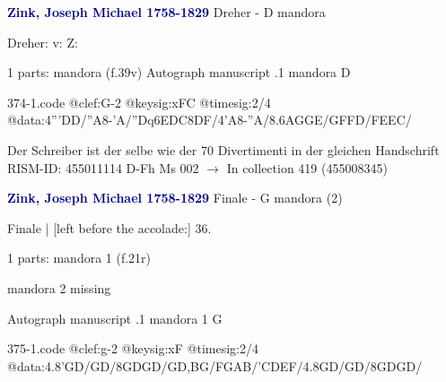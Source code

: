 \documentclass[twocolumn]{book}
\begin{document}
\newline \par \vspace{7pt} \textcolor{darkblue}{\textbf{Zink, Joseph Michael  1758-1829}}
\newline Dreher - D
\newline mandora
\newline \begin{itshape}[f.39v, at left:] Dreher: v: Z:\end{itshape} 
\newline \textcolor{darkblue}{}  1 parts: mandora  (f.39v)
\newline Autograph manuscript
.1  mandora  D  
\begin{filecontents*}{374-1.code}
@clef:G-2
@keysig:xFC
@timesig:2/4
@data:4'''DD/''A8-'A/{''Dq6EDC}{8DF}/4'A8-''A/{8.6AGGE}/{GFFD}/{FEEC}/
\end{filecontents*}
\newline
%

\newline Der Schreiber ist der selbe wie der 70 Divertimenti in der gleichen Handschrift
\newline RISM-ID: 455011114
\newline D-Fh  Ms 002
\newline $\rightarrow$ In collection 419 (455008345)
      
\newline \par \vspace{7pt} \textcolor{darkblue}{\textbf{Zink, Joseph Michael  1758-1829}}
\newline Finale - G
\newline mandora (2)
\newline \begin{itshape}[f.21r, at left:] Finale | [left before the accolade:] 36.\end{itshape} 
\newline \textcolor{darkblue}{}  1 parts: mandora 1  (f.21r)
\newline \begin{small} mandora 2 missing\end{small} 
\newline Autograph manuscript
.1  mandora 1  G  
\begin{filecontents*}{375-1.code}
@clef:g-2
@keysig:xF
@timesig:2/4
@data:4.8'GD/GD/8GDGD/GD,BG/FGAB/'CDEF/4.8GD/GD/8GDGD/
\end{filecontents*}
\newline
%
\end{document}
